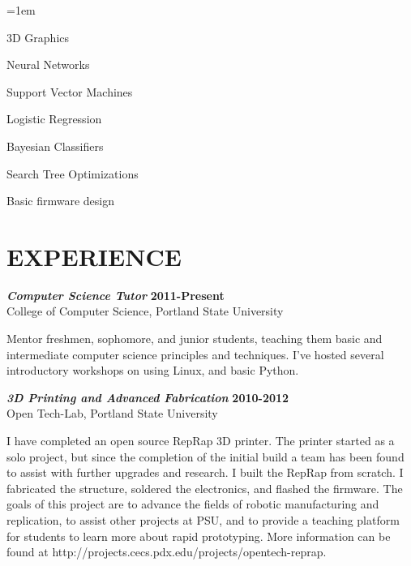 \documentclass[margin]{res}
\begin{document}
\begin{resume}
\begin{multicols}{3}[\columnsep 2pt \linewidth 400pt]
									\begin{list} {}{\leftmargin=1em}\itemsep -2pt
										\item 3D Graphics 
										\item Neural Networks 
										\item Support Vector Machines 
										\item Logistic Regression 
										\item Bayesian Classifiers 
										\item Search Tree Optimizations 
										\item Basic firmware design 
									\end{list}
								\end{multicols}

\section{EXPERIENCE}
				{\sl \textbf{Computer Science Tutor}} \hfill \textbf{2011-Present} \\
                College of Computer Science, Portland State University \hfill
				
				Mentor freshmen, sophomore, and junior students, teaching them basic and intermediate 
				computer science principles and techniques.	I've hosted several introductory workshops 
				on using Linux, and basic Python.
				
				{\sl \textbf{3D Printing and Advanced Fabrication}} \hfill \textbf{2010-2012} \\
                Open Tech-Lab, Portland State University
				
				I have completed an open source RepRap 3D printer. The printer started as a solo project, 
				but since the completion of the initial build a team has been found to assist with further 
				upgrades and research.  I built the RepRap from scratch.  I fabricated the structure, soldered  
				the electronics, and flashed the firmware. 	The goals of this project are to advance the 
				fields of robotic manufacturing and replication, to assist other projects at PSU, and to 
				provide a teaching platform for students to learn more about rapid prototyping. 
				More information can be found at http://projects.cecs.pdx.edu/projects/opentech-reprap. 
 				
\end{resume}
\end{document}
